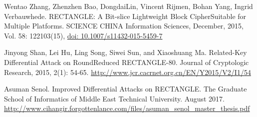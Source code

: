 \documentclass[final]{transcrypto}
\begin{document}
\begin{thebibliography}{9}
Wentao Zhang, Zhenzhen Bao, DongdaiLin, Vincent Rijmen, Bohan Yang, Ingrid Verbauwhede. RECTANGLE: A Bit-slice Lightweight Block CipherSuitable for Multiple Platforms. SCIENCE CHINA Information Sciences, December, 2015, Vol. 58: 122103(15), \href{https://www.doi.org/10.1007/s11432-015-5459-7}{doi: 10.1007/s11432-015-5459-7}

Jinyong Shan, Lei Hu, Ling Song, Siwei Sun, and Xiaoshuang Ma. Related-Key Differential Attack on RoundReduced RECTANGLE-80.  Journal of Cryptologic Research, 2015, 2(1): 54-65. \href{http://www.jcr.cacrnet.org.cn/EN/Y2015/V2/I1/54}{http://www.jcr.cacrnet.org.cn/EN/Y2015/V2/I1/54}

Asuman Senol. Improved Differential Attacks on RECTANGLE. The Graduate School of Informatics of Middle East Technical University. August 2017. \href{http://www.cihangir.forgottenlance.com/files/asuman_senol_master_thesis.pdf}{http://www.cihangir.forgottenlance.com/files/asuman\_senol\_master\_thesis.pdf}
\end{thebibliography}
\end{document}
